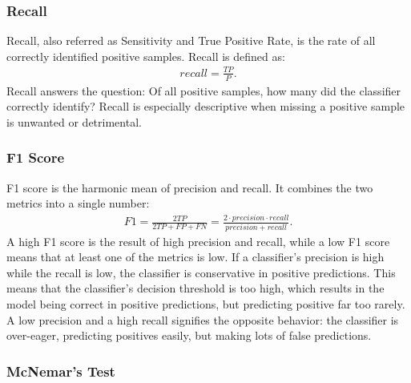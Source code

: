 \documentclass[english, 12pt, a4paper, sci, utf8, a-2b, online]{latex/definitions/aaltothesis}
\begin{document}
\subsubsection*{Recall}
Recall, also referred as Sensitivity and True Positive Rate, is the rate of all correctly identified positive samples. Recall is defined as:
\begin{align*}
    recall = \frac{TP}{P}.
\end{align*}
Recall answers the question: Of all positive samples, how many did the classifier correctly identify? Recall is especially descriptive when missing a positive sample is unwanted or detrimental.
\subsubsection*{F1 Score} 
F1 score is the harmonic mean of precision and recall. It combines the two metrics into a single number:
\begin{align*}
    F1 = \frac{2 TP}{2 TP + FP + FN} = \frac{2 \cdot precision \cdot recall}{precision + recall}.
\end{align*}
A high F1 score is the result of high precision and recall, while a low F1 score means that at least one of the metrics is low. If a classifier's precision is high while the recall is low, the classifier is conservative in positive predictions. This means that the classifier's decision threshold is too high, which results in the model being correct in positive predictions, but predicting positive far too rarely. A low precision and a high recall signifies the opposite behavior: the classifier is over-eager, predicting positives easily, but making lots of false predictions.

\subsubsection*{McNemar's Test}


\end{document}

